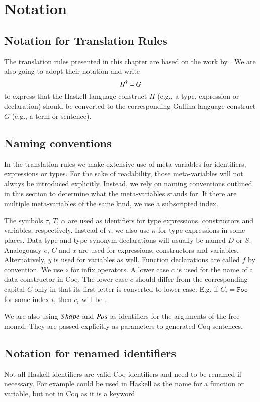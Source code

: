 \section{Notation} \label{sec:translation:notation}
\subsection{Notation for Translation Rules}
The translation rules presented in this chapter are based on the work by \cite{Abel:2005}.
We are also going to adopt their notation and write
\[
  {H}^{\dagger} = G
\]
to express that the Haskell language construct $H$ (e.g., a type, expression or declaration) should be converted to the corresponding Gallina language construct $G$ (e.g., a term or sentence).

\subsection{Naming conventions}
In the translation rules we make extensive use of meta-variables for identifiers, expressions or types.
For the sake of readability, those meta-variables will not always be introduced explicitly.
Instead, we rely on naming conventions outlined in this section to determine what the meta-variables stands for.
If there are multiple meta-variables of the same kind, we use a subscripted index.

The symbols $\tau$, $T$, $\alpha$ are used as identifiers for type expressions, constructors and variables, respectively.
Instead of $\tau$, we also use $\kappa$ for type expressions in some places.
Data type and type synonym declarations will usually be named $D$ or $S$.
Analogously $e$, $C$ and $x$ are used for expressions, constructors and variables.
Alternatively, $y$ is used for variables as well.
Function declarations are called $f$ by convention.
We use $\circ$ for infix operators.
A lower case $c$ is used for the name of a data constructor in Coq.
The lower case $c$ should differ from the corresponding capital $C$ only in that its first letter is converted to lower case.
E.g. if $C_i = \texttt{Foo}$ for some index $i$, then $c_i$ will be .

We are also using $Shape$ and $Pos$ as identifiers for the arguments of the free monad.
They are passed explicitly as parameters to generated Coq sentences.

\subsection{Notation for renamed identifiers}
Not all Haskell identifiers are valid Coq identifiers and need to be renamed if necessary.
For example  could be used in Haskell as the name for a function or variable, but not in Coq as it is a keyword.

